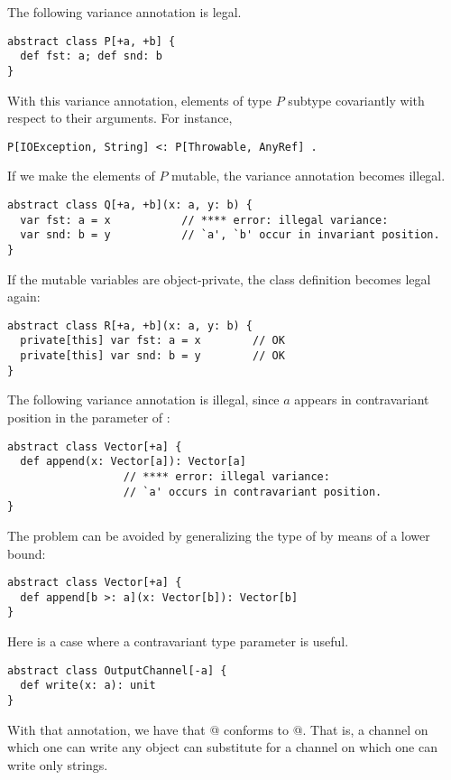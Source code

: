 \example The following variance annotation is legal. 
\begin{lstlisting}
abstract class P[+a, +b] {
  def fst: a; def snd: b
}
\end{lstlisting}
With this variance annotation, elements
of type $P$ subtype covariantly with respect to their arguments. 
For instance, 
\begin{lstlisting}
P[IOException, String] <: P[Throwable, AnyRef] .
\end{lstlisting}

If we make the elements of $P$ mutable, 
the variance annotation becomes illegal. 
\begin{lstlisting}
abstract class Q[+a, +b](x: a, y: b) { 
  var fst: a = x           // **** error: illegal variance:
  var snd: b = y           // `a', `b' occur in invariant position.
}
\end{lstlisting}
If the mutable variables are object-private, the class definition
becomes legal again:
\begin{lstlisting}
abstract class R[+a, +b](x: a, y: b) { 
  private[this] var fst: a = x        // OK
  private[this] var snd: b = y        // OK
}
\end{lstlisting}

\example The following variance annotation is illegal, since $a$ appears
in contravariant position in the parameter of :

\begin{lstlisting}
abstract class Vector[+a] {
  def append(x: Vector[a]): Vector[a]  
                  // **** error: illegal variance: 
                  // `a' occurs in contravariant position.
}
\end{lstlisting} 
The problem can be avoided by generalizing the type of 
by means of a lower bound:

\begin{lstlisting}
abstract class Vector[+a] {
  def append[b >: a](x: Vector[b]): Vector[b] 
}
\end{lstlisting}

\example Here is a case where a contravariant type parameter is useful.

\begin{lstlisting}
abstract class OutputChannel[-a] {
  def write(x: a): unit
}
\end{lstlisting}
With that annotation, we have that
\lstinline@OutputChannel[AnyRef]@ conforms to \lstinline@OutputChannel[String]@.  
That is, a
channel on which one can write any object can substitute for a channel
on which one can write only strings.

